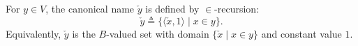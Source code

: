For $y \in V$, the canonical name $\check{y}$ is defined by $\in$-recursion:
$$\check{y} \triangleq \{ \langle \check{x}, 1 \rangle \mid x \in y \}.$$
Equivalently, $\check{y}$ is the $B$-valued set with domain $\{\check{x} \mid x \in y\}$ and constant value $1$.
